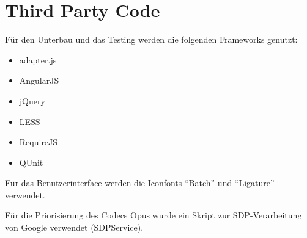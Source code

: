 \section{Third Party Code}
	Für den Unterbau und das Testing werden die folgenden Frameworks genutzt:
	\begin{itemize}
		\item{adapter.js}
		\item{AngularJS}
		\item{jQuery}
		\item{LESS}
		\item{RequireJS}
		\item{QUnit}
	\end{itemize}

	Für das Benutzerinterface werden die Iconfonts "`Batch"' und "`Ligature"'
	verwendet.

	Für die Priorisierung des Codecs Opus wurde ein Skript zur SDP-Verarbeitung
	von Google verwendet (SDPService).
